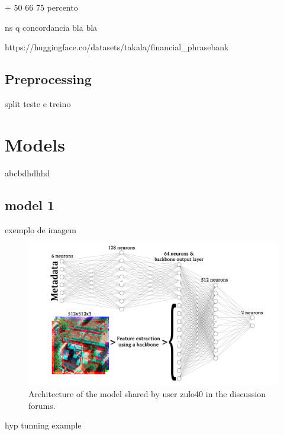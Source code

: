 \documentclass[conference]{IEEEtran}
\begin{document}
+ 50 66 75 percento

ns q concordancia bla bla

https://huggingface.co/datasets/takala/financial\_phrasebank
\cite{dataset, malo2013gooddebtbaddebt}


\subsection{Preprocessing}

split teste e treino

\section{Models}

abcbdhdhhd

\subsection{model 1}

exemplo de imagem

\begin{figure}[H]
    \centering
    \includegraphics[width=1\linewidth]{assets/nn.png}
    \caption{Architecture of the model shared by user zulo40 in the discussion forums.}
    \label{fig:nn}
\end{figure}

hyp tunning example
\end{document}
